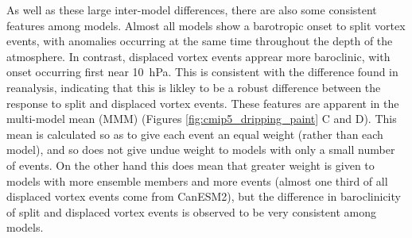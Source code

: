 As well as these large inter-model differences, there are also some consistent
features among models. Almost all models show a barotropic onset to split vortex
events, with anomalies occurring at the same time throughout the depth of the
atmosphere. In contrast, displaced vortex events apprear more baroclinic, with
onset occurring first near 10~hPa. This is consistent with the difference found
in reanalysis, indicating that this is likley to be a robust difference between
the response to split and displaced vortex events. These features are apparent
in the multi-model mean (MMM) (Figures \ref{fig:cmip5_dripping_paint}
C and D). This mean is calculated so as to give each event an equal weight (rather
than each model), and so does not give undue weight to models with only a small
number of events. On the other hand this does mean that greater weight is given
to models with more ensemble members and more events (almost one third of all
displaced vortex events come from CanESM2), but the difference in baroclinicity
of split and displaced vortex events is observed to be very consistent among
models.


